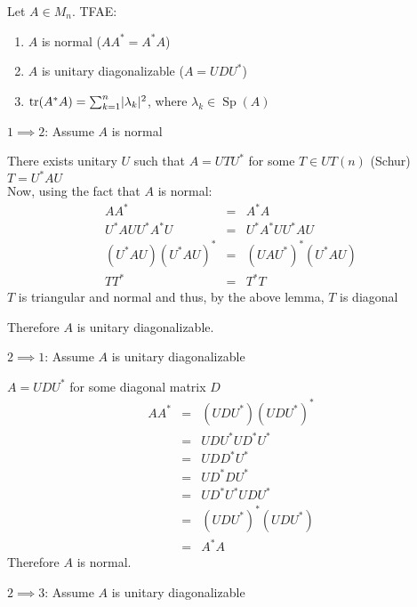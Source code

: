 \documentclass[letterpaper,12pt,fleqn]{article}
\renewcommand{\l}{\lambda}
\DeclareMathOperator{\tr}{tr}
\DeclareMathOperator{\Sp}{Sp}
\begin{document}
\begin{theorem}
  Let $A\in M_n$. TFAE:
  \begin{enumerate}
  \item $A$ is normal ($AA^*=A^*A$)
  \item $A$ is unitary diagonalizable ($A=UDU^*$)
  \item $\tr(A^*A)=\sum_{k=1}^n\abs{\l_k}^2$, where $\l_k\in\Sp(A)$
  \end{enumerate}
\end{theorem}

\begin{theproof}
  \listbreak
  \begin{description}
  \item $1\implies2$: Assume $A$ is normal

    There exists unitary $U$ such that $A=UTU^*$ for some $T\in UT(n)$
    (Schur) \\
    $T=U^*AU$ \\
    Now, using the fact that $A$ is normal:
    \begin{eqnarray*}
      AA^* &=& A^*A \\
      U^*AUU^*A^*U &=& U^*A^*UU^*AU \\
      (U^*AU)(U^*AU)^* &=& (UAU^*)^*(U^*AU) \\
      TT^* &=& T^*T
    \end{eqnarray*}
    $T$ is triangular and normal and thus, by the above lemma, $T$ is diagonal

    Therefore $A$ is unitary diagonalizable.

  \item $2\implies1$: Assume $A$ is unitary diagonalizable

    $A=UDU^*$ for some diagonal matrix $D$
    \begin{eqnarray*}
      AA^* &=& (UDU^*)(UDU^*)^* \\
      &=& UDU^*UD^*U^* \\
      &=& UDD^*U^* \\
      &=& UD^*DU^* \\
      &=& UD^*U^*UDU^* \\
      &=& (UDU^*)^*(UDU^*) \\
      &=& A^*A
    \end{eqnarray*}
    Therefore $A$ is normal.

  \item $2\implies3$: Assume $A$ is unitary diagonalizable

    \newcommand{\md}{\begin{bmatrix}
        \l_1 & & 0 \\ & \ddots & \\ 0 & & \l_n
    \end{bmatrix}}


\end{description}
\end{theproof}
\end{document}
